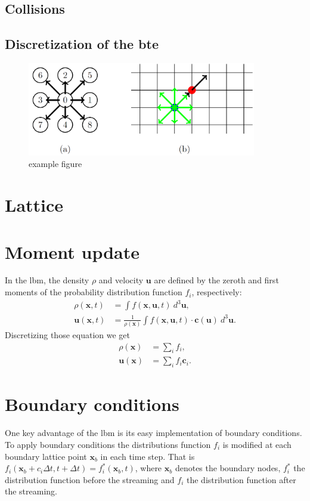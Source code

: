 \documentclass[a4paper,11pt, footsepline]{book}
\begin{document}
\subsection*{Collisions}
\subsection*{Discretization of the \ac{bte}}
\begin{figure}[h!]
  \begin{center}
   \includegraphics[width=10cm]{logos/Gitter_LBM.png}
   \caption{example figure}
  \label{fig:mesh}
  \end{center}
\end{figure}
\section{Lattice}
\section{Moment update}\label{sec-momentUpdate}
In the \ac{lbm}, the density $\rho$ and velocity $\mathbf{u}$ are defined by the zeroth and first moments of the probability distribution function $f_i$, respectively:
\begin{align*} 
\rho(\mathbf{x},t) &=  \int f(\mathbf{x}, \mathbf{u},t)~d^{3}\mathbf{u}, \\ 
\mathbf{u}(\mathbf{x},t) &=  \frac{1}{\rho(\mathbf{x})}\int f(\mathbf{x}, \mathbf{u},t)\cdot\mathbf{c}(\mathbf{u})~d^{3}\mathbf{u}.
\end{align*}
Discretizing those equation we get
\begin{align*} 
\rho(\mathbf{x}) &=  \sum\limits_{i} f_{i}, \\ 
\mathbf{u}(\mathbf{x}) &=  \sum\limits_{i} f_{i}\mathbf{c}_{i}.
\end{align*}
\section{Boundary conditions}\label{sec-boundaryConditions}
One key advantage of the \ac{lbm} is its easy implementation of boundary conditions. To apply boundary conditions the distributions function $f_i$ is modified at each boundary lattice point $\mathbf{x}_{b}$ in each time step. That is $f_i(\mathbf{x}_{b}+c_{i}\Delta t, t+\Delta t)=f_{i}^{\ast}(\mathbf{x}_b,t)$, where $\mathbf{x}_b$ denotes the boundary nodes, $f_{i}^{\ast}$ the distribution function before the streaming and $f_{i}$ the distribution function after the streaming.
\end{document}
